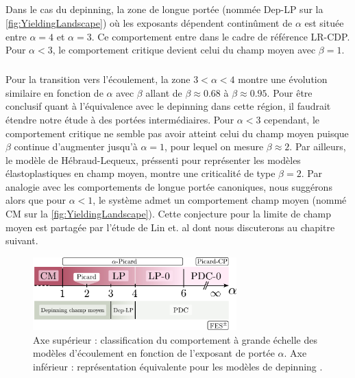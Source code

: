 \subparagraph{}Dans le cas du depinning, la zone de longue portée (nommée Dep-LP sur la \autoref{fig:YieldingLandscape}) où les exposants dépendent continûment de $\alpha$ est située entre $\alpha=4$ et $\alpha=3$. Ce comportement entre dans le cadre de référence LR-CDP. Pour $\alpha<3$, le comportement critique devient celui du champ moyen avec $\beta=1$.

\subparagraph{}Pour la transition vers l'écoulement, la zone $3<\alpha<4$ montre une évolution similaire en fonction de $\alpha$ avec $\beta$ allant de $\beta\approx 0.68$ à $\beta\approx 0.95$. Pour être conclusif quant à l'équivalence avec le depinning dans cette région, il faudrait étendre notre étude à des portées intermédiaires. Pour $\alpha<3$ cependant, le comportement critique ne semble pas avoir atteint celui du champ moyen puisque $\beta$ continue d'augmenter jusqu'à $\alpha=1$, pour lequel on mesure $\beta\approx 2$. Par ailleurs, le modèle de Hébraud-Lequeux, préssenti pour représenter les modèles élastoplastiques en champ moyen, montre une criticalité de type $\beta=2$. Par analogie avec les comportements de longue portée canoniques, nous suggérons alors que pour $\alpha<1$, le système admet un comportement champ moyen (nommé CM sur la \autoref{fig:YieldingLandscape}). Cette conjecture pour la limite de champ moyen est partagée par l'étude de Lin et. al \cite{lin_mean-field_2016} dont nous discuterons au chapitre suivant.

\begin{figure}[h]
	\centering
	\includegraphics[width=0.7\textwidth]{Chapitre4/Figures/LonguePortee/axe_alpha.pdf}
	\caption{Axe supérieur : classification du comportement à grande échelle des modèles d'écoulement en fonction de l'exposant de portée $\alpha$. Axe inférieur : représentation équivalente pour les modèles de depinning \cite{cao_localization_2018}.}
	\label{fig:YieldingLandscape}
\end{figure}

